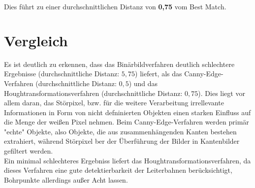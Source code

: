 Dies führt zu einer durchschnittlichen Distanz von \textbf{0,75} vom Best Match.

\section{Vergleich}
Es ist deutlich zu erkennen, dass das Binärbildverfahren deutlich schlechtere Ergebnisse (durchschnittliche Distanz: $5,75$) liefert, als das Canny-Edge-Verfahren (durchschnittliche Distanz: $0,5$) und das Houghtransformationsverfahren (durchschnittliche Distanz: $0,75$). Dies liegt vor allem daran, das Störpixel, bzw. für die weitere Verarbeitung irrellevante Informationen in Form von nicht defninierten Objekten einen starken Einfluss auf die Menge der weißen Pixel nehmen. Beim Canny-Edge-Verfahren werden primär "echte" Objekte, also Objekte, die aus zusammenhängenden Kanten bestehen extrahiert, während Störpixel ber der Überführung der Bilder in Kantenbilder gefiltert werden. \\
Ein minimal schlechteres Ergebniss liefert das Houghtransformationsverfahren, da dieses Verfahren eine gute detektierbarkeit der Leiterbahnen berücksichtigt, Bohrpunkte allerdings außer Acht lassen.


